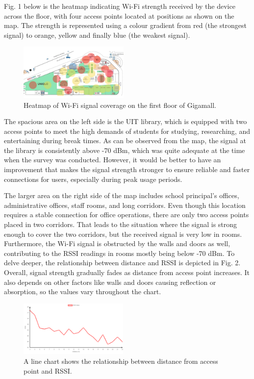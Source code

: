\documentclass[conference]{IEEEtran}
\begin{document}
Fig. 1 below is the heatmap indicating Wi-Fi strength received by the device across the floor, with four access points located at positions as shown on the map. The strength is represented using a colour gradient from red (the strongest signal) to orange, yellow and finally blue (the weakest signal).

\begin{figure}[htbp]
    \centering
    \includegraphics[width=0.48\textwidth]{heatmap.png}
    \caption{Heatmap of Wi-Fi signal coverage on the first floor of Gigamall.}
\end{figure}

The spacious area on the left side is the UIT library, which is equipped with two access points to meet the high demands of students for studying, researching, and entertaining during break times. As can be observed from the map, the signal at the library is consistently above -70 dBm, which was quite adequate at the time when the survey was conducted. However, it would be better to have an improvement that makes the signal strength stronger to ensure reliable and faster connections for users, especially during peak usage periods.

The larger area on the right side of the map includes school principal’s offices, administrative offices, staff rooms, and long corridors. Even though this location requires a stable connection for office operations, there are only two access points placed in two corridors. That leads to the situation where the signal is strong enough to cover the two corridors, but the received signal is very low in rooms. Furthermore, the Wi-Fi signal is obstructed by the walls and doors as well, contributing to the RSSI readings in rooms mostly being below -70 dBm. To delve deeper, the relationship between distance and RSSI is depicted in Fig. 2. Overall, signal strength gradually fades as distance from access point increases. It also depends on other factors like walls and doors causing reflection or absorption, so the values vary throughout the chart.

\begin{figure}[htbp]
    \centering
    \includegraphics[width=0.48\textwidth]{rssi.png}
    \caption{A line chart shows the relationship between distance from access
point and RSSI.}
\end{figure}
\end{document}

